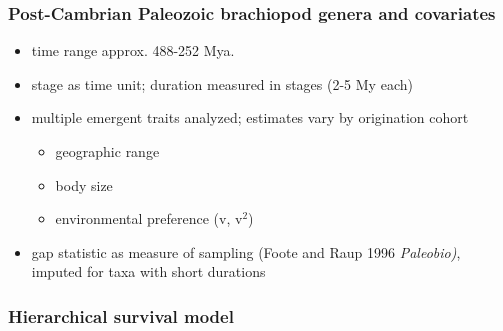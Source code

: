\documentclass{beamer}
\begin{document}
\begin{frame}
  \frametitle{Post-Cambrian Paleozoic brachiopod genera and covariates}
  \begin{itemize}
    \item time range approx. 488-252 Mya.
    \item stage as time unit; duration measured in stages (2-5 My each)
    \item multiple emergent traits analyzed; estimates vary by origination cohort
      \begin{itemize}
        \item geographic range
        \item body size
        \item environmental preference (v, v\(^2\))
      \end{itemize}
    \item gap statistic as measure of sampling {\footnotesize{(Foote and Raup 1996 \em{Paleobio})}}, imputed for taxa with short durations
  \end{itemize}
\end{frame}


\begin{frame}
  \frametitle{Hierarchical survival model}
  \begin{center}
  \end{center}
\end{frame}
\end{document}
